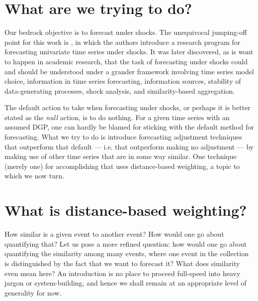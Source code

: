 \documentclass{uiucthesis2021}
\theoremstyle{definition}
\begin{document}
\section{What are we trying to do?}

Our bedrock objective is to forecast under shocks.  The unequivocal jumping-off point for this work is \cite[][]{lin2021minimizing}, in which the authors introduce a research program for forecasting univariate time series under shocks.  It was later discovered, as is wont to happen in academic research, that the task of forecasting under shocks could and should be understood under a grander framework involving time series model choice, information in time series forecasting, information sources, stability of data-generating processes, shock analysis, and similarity-based aggregation.  

The default action to take when forecasting under shocks, or perhaps it is better stated as the \textit{null} action, is to do nothing.  For a given time series with an assumed DGP, one can hardly be blamed for sticking with the default method for forecasting.  What we try to do is introduce forecasting adjustment techniques that outperform that default --- i.e. that outperform making no adjustment --- by making use of other time series that are in some way similar.  One technique (merely one) for accomplishing that uses distance-based weighting, a topic to which we now turn.


\section{What is distance-based weighting?}
How similar is a given event to another event?  How would one go about quantifying that?  Let us pose a more refined question: how would one go about quantifying the similarity among many events, where one event in the collection is distinguished by the fact that we want to forecast it?  What does similarity even mean here?  An introduction is no place to proceed full-speed into heavy jargon or system-building, and hence we shall remain at an appropriate level of generality for now.
\end{document}
